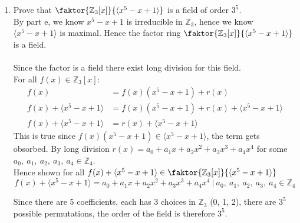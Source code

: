 \documentclass[12pt]{article}
\begin{document}
\begin{enumerate}
\begin{enumerate}
	\end{enumerate}

	\item Prove that $\faktor{\mathbb{Z}_3[x]}{\langle x^5 - x + 1 \rangle}$ is a
		field of order $3^5$.\\
		By part e, we know $ x^5 - x + 1$ is irreducible in $\mathbb{Z}_3$, hence we
		know $\langle x^5 - x + 1 \rangle$ is maximal. Hence the factor ring
		$\faktor{\mathbb{Z}_3[x]}{\langle x^5 - x + 1 \rangle}$ is a field.\\\\
		Since the factor is a field there exist long division for this field.\\
		For all $f(x) \in \mathbb{Z}_3[x]$:
		\begin{align*}
			f(x) &= f(x)(x^5 - x + 1) + r(x)\\
			f(x) + \langle x^5 - x + 1 \rangle &= f(x)(x^5 - x + 1) + r(x) + \langle
			x^5 - x + 1 \rangle\\
			f(x) + \langle x^5 - x + 1 \rangle &= r(x) + \langle x^5 - x + 1 \rangle
		\end{align*}
		This is true since $f(x)(x^5 - x + 1) \in \langle x^5 - x + 1 \rangle$, the
		term gets obsorbed. By long division $r(x) = a_0 + a_1x + a_2x^2 + a_3x^3 +
		a_4x^4$ for some $a_0,\ a_1,\ a_2,\ a_3,\ a_4 \in \mathbb{Z}_4$.\\
		Hence shown for all $f(x) + \langle x^5 - x + 1 \rangle \in
		\faktor{\mathbb{Z}_3[x]}{\langle x^5 - x + 1 \rangle}$
		$$f(x) + \langle x^5 - x + 1 \rangle = a_0 + a_1x + a_2x^2 + a_3x^3 +
		a_4x^4\ |\ a_0,\ a_1,\ a_2,\ a_3,\ a_4 \in \mathbb{Z}_4$$

		Since there are 5 coefficients, each has 3 choices in $\mathbb{Z}_3$ (0, 1,
		2), there are $3^5$ possible permutations, the order of the field is
		therefore $3^5$. 

\end{enumerate}
\end{document}
